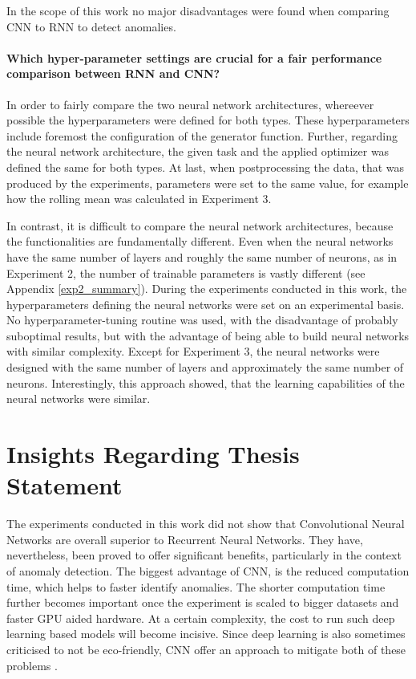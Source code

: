 In the scope of this work no major disadvantages were found when comparing CNN to RNN to detect anomalies.


\paragraph{Which hyper-parameter settings are crucial for a fair performance comparison between RNN and CNN?} In order to fairly compare the two neural network architectures, whereever possible the hyperparameters were defined for both types. These hyperparameters include foremost the configuration of the generator function. Further, regarding the neural network architecture, the given task and the applied optimizer was defined the same for both types. At last, when postprocessing the data, that was produced by the experiments, parameters were set to the same value, for example how the rolling mean was calculated in Experiment 3.

In contrast, it is difficult to compare the neural network architectures, because the functionalities are fundamentally different. Even when the neural networks have the same number of layers and roughly the same number of neurons, as in Experiment 2, the number of trainable parameters is vastly different (see Appendix \ref{exp2_summary}). During the experiments conducted in this work, the hyperparameters defining the neural networks were set on an experimental basis. No hyperparameter-tuning routine was used, with the disadvantage of probably suboptimal results, but with the advantage of being able to build neural networks with similar complexity. Except for Experiment 3, the neural networks were designed with the same number of layers and approximately the same number of neurons. Interestingly, this approach showed, that the learning capabilities of the neural networks were similar.

\section{Insights Regarding Thesis Statement}

The experiments conducted in this work did not show that Convolutional Neural Networks are overall superior to Recurrent Neural Networks. They have, nevertheless, been proved to offer significant benefits, particularly in the context of anomaly detection. The biggest advantage of CNN, is the reduced computation time, which helps to faster identify anomalies. The shorter computation time further becomes important once the experiment is scaled to bigger datasets and faster GPU aided hardware. At a certain complexity, the cost to run such deep learning based models will become incisive. Since deep learning is also sometimes criticised to not be eco-friendly, CNN offer an approach to mitigate both of these problems \parencite{Walleser2021}.

